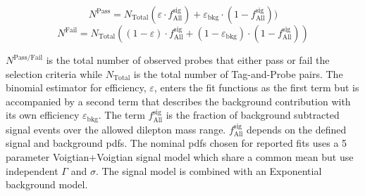 \begin{equation}
	N^{\text{Pass}} = N_{\text{Total}} (\varepsilon \cdot f^{\text{sig}}_{\text{All}} ) +  \varepsilon_{\text{bkg}} \cdot (1-f^{\text{sig} }_{\text{All}}) )
\end{equation} 
\begin{equation}
	N^{\text{Fail}} = N_{\text{Total}} ( (1-\varepsilon) \cdot f^{\text{sig}}_{\text{All}} +   (1-\varepsilon_{\text{bkg}}) \cdot (1-f^{\text{sig}}_{\text{All}}) )
\end{equation}

$N^{\text{Pass/Fail}}$ is the total number of observed probes that either pass or fail the selection criteria while $N_{\text{Total}}$ is the total number of Tag-and-Probe pairs.
The binomial estimator for efficiency, $\varepsilon$, enters the fit functions as the first term but is accompanied by a second term that describes the background contribution with its own efficiency $\varepsilon_{\text{bkg}}$.  The term $f^{\text{sig}}_{\text{All}}$ is the fraction of background subtracted signal events over the allowed dilepton mass range.  $f^{\text{sig}}_{\text{All}}$ depends on the defined signal and background pdfs. The nominal pdfs chosen for reported fits uses a 5 parameter Voigtian+Voigtian signal model which share a common mean but use independent $\Gamma$ and $\sigma$.  The signal model is combined with an Exponential background model. 








\FloatBarrier
